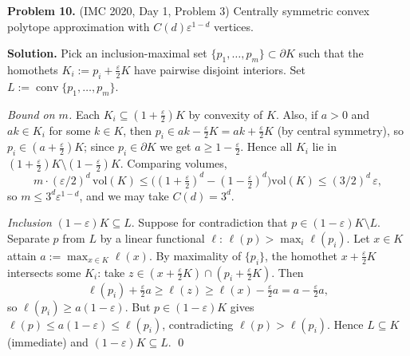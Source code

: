 \documentclass{article}
\begin{document}
\textbf{Problem 10.} (IMC 2020, Day 1, Problem 3)
Centrally symmetric convex polytope approximation with \( C(d) \varepsilon^{1-d} \) vertices.

\textbf{Solution.}
Pick an inclusion-maximal set \( \{p_1, \ldots, p_m\} \subset \partial K \) such that the homothets \( K_i := p_i + \tfrac{\varepsilon}{2} K \) have pairwise disjoint interiors. Set \( L := \operatorname{conv}\{p_1, \ldots, p_m\} \).

\emph{Bound on \( m \).} Each \( K_i \subseteq (1 + \tfrac{\varepsilon}{2}) K \) by convexity of \( K \). Also, if \( a > 0 \) and \( a k \in K_i \) for some \( k \in K \), then \( p_i \in a k - \tfrac{\varepsilon}{2} K = a k + \tfrac{\varepsilon}{2} K \) (by central symmetry), so \( p_i \in (a + \tfrac{\varepsilon}{2}) K \); since \( p_i \in \partial K \) we get \( a \geq 1 - \tfrac{\varepsilon}{2} \). Hence all \( K_i \) lie in \( (1 + \tfrac{\varepsilon}{2}) K \setminus (1 - \tfrac{\varepsilon}{2}) K \). Comparing volumes,
\[
m \cdot (\varepsilon/2)^d \,\mathrm{vol}(K) \leq \bigl((1 + \tfrac{\varepsilon}{2})^d - (1 - \tfrac{\varepsilon}{2})^d\bigr) \mathrm{vol}(K) \leq (3/2)^d\, \varepsilon,
\]
so \( m \leq 3^d \varepsilon^{1-d} \), and we may take \( C(d) = 3^d \).

\emph{Inclusion} \( (1 - \varepsilon) K \subseteq L \). Suppose for contradiction that \( p \in (1 - \varepsilon) K \setminus L \). Separate \( p \) from \( L \) by a linear functional \( \ell \): \( \ell(p) > \max_i \ell(p_i) \). Let \( x \in K \) attain \( a := \max_{x \in K} \ell(x) \). By maximality of \( \{p_i\} \), the homothet \( x + \tfrac{\varepsilon}{2} K \) intersects some \( K_i \): take \( z \in (x + \tfrac{\varepsilon}{2} K) \cap (p_i + \tfrac{\varepsilon}{2} K) \). Then
\[
\ell(p_i) + \tfrac{\varepsilon}{2} a \geq \ell(z) \geq \ell(x) - \tfrac{\varepsilon}{2} a = a - \tfrac{\varepsilon}{2} a,
\]
so \( \ell(p_i) \geq a(1 - \varepsilon) \). But \( p \in (1 - \varepsilon) K \) gives \( \ell(p) \leq a (1 - \varepsilon) \leq \ell(p_i) \), contradicting \( \ell(p) > \ell(p_i) \). Hence \( L \subseteq K \) (immediate) and \( (1 - \varepsilon) K \subseteq L \). \qed
\end{document}
